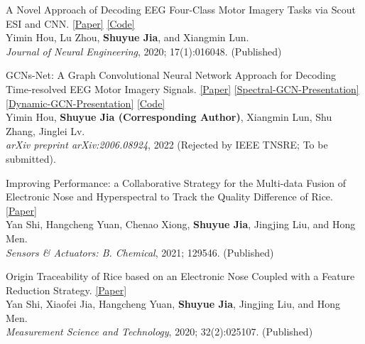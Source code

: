 \documentclass{my_cv}
\begin{document}
\hspace*{\fill}

\workitemsone
{A Novel Approach of Decoding EEG Four-Class Motor Imagery Tasks via Scout ESI and CNN. \href{https://iopscience.iop.org/article/10.1088/1741-2552/ab4af6/meta}{[Paper]} \href{https://github.com/SuperBruceJia/EEG-Motor-Imagery-Classification-CNNs-TensorFlow}{[Code]}\\
	Yimin Hou, Lu Zhou, \textbf{Shuyue Jia}, and Xiangmin Lun. \\
	\emph{Journal of Neural Engineering}, 2020; 17(1):016048. (Published)
}

\hspace*{\fill}

\workitemsone
{GCNs-Net: A Graph Convolutional Neural Network Approach for Decoding Time-resolved EEG Motor Imagery Signals. \href{https://arxiv.org/abs/2006.08924}{[Paper]} \href{https://shuyuej.com/files/GCNs-Net.pdf}{[Spectral-GCN-Presentation]} \href{https://shuyuej.com/files/Dynamic-GCN-Survey.pdf}{[Dynamic-GCN-Presentation]} \href{https://github.com/SuperBruceJia/EEG-DL}{[Code]}\\
	Yimin Hou, \textbf{Shuyue Jia (Corresponding Author)}, Xiangmin Lun, Shu Zhang, Jinglei Lv. \\
	\emph{arXiv preprint arXiv:2006.08924}, 2022 (Rejected by IEEE TNSRE; To be submitted).
}

\hspace*{\fill} 

\workitemsone
{Improving Performance: a Collaborative Strategy for the Multi-data Fusion of Electronic Nose and Hyperspectral to Track the Quality Difference of Rice. \href{https://www.sciencedirect.com/science/article/abs/pii/S0925400521001143}{[Paper]} \\
	Yan Shi, Hangcheng Yuan, Chenao Xiong, \textbf{Shuyue Jia}, Jingjing Liu, and Hong Men.\\
	\emph{Sensors \& Actuators: B. Chemical}, 2021; 129546. (Published)
}
	
\hspace*{\fill}

\workitemsone
{Origin Traceability of Rice based on an Electronic Nose Coupled with a Feature Reduction Strategy. \href{https://iopscience.iop.org/article/10.1088/1361-6501/abb9e7/meta}{[Paper]} \\
	Yan Shi, Xiaofei Jia, Hangcheng Yuan, \textbf{Shuyue Jia}, Jingjing Liu, and Hong Men.\\
	\emph{Measurement Science and Technology}, 2020; 32(2):025107. (Published)
}
	
\end{document}
